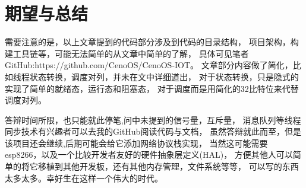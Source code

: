 



\chapter{期望与总结}
需要注意的是，以上文章提到的代码部分涉及到代码的目录结构，
项目架构，构建工具链等，可能无法简单的从文章中简单的了解，
具体可见笔者GitHub:https://github.com/CenoOS/CenoOS-IOT。
文章部分内容做了简化，比如线程状态转换，调度对列，并未在文中详细道出，
对于状态转换，只是隐式的实现了简单的就绪态，运行态和阻塞态，
对于调度而是用简化的32比特位来代替调度对列。

答辩时间所限，也只能就此停笔,问中未提到的信号量，互斥量，
消息队列等线程同步技术有兴趣者可以去我的GitHub阅读代码与文档，
虽然答辩就此而至，但是该项目还会继续,后期可能会给它添加网络协议栈实现，
当然这可能需要esp8266，以及一个比较开发者友好的硬件抽象层定义(HAL)，
方便其他人可以简单的将它移植到其他开发板，还有其他内存管理，文件系统等等，
可以写的东西太多太多。幸好生在这样一个伟大的时代。





